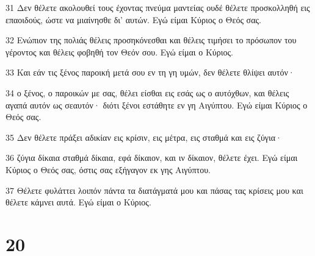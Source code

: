\par 31 Δεν θέλετε ακολουθεί τους έχοντας πνεύμα μαντείας ουδέ θέλετε προσκολληθή εις επαοιδούς, ώστε να μιαίνησθε δι' αυτών. Εγώ είμαι Κύριος ο Θεός σας.
\par 32 Ενώπιον της πολιάς θέλεις προσηκόνεσθαι και θέλεις τιμήσει το πρόσωπον του γέροντος και θέλεις φοβηθή τον Θεόν σου. Εγώ είμαι ο Κύριος.
\par 33 Και εάν τις ξένος παροική μετά σου εν τη γη υμών, δεν θέλετε θλίψει αυτόν·
\par 34 ο ξένος, ο παροικών με σας, θέλει είσθαι εις εσάς ως ο αυτόχθων, και θέλεις αγαπά αυτόν ως σεαυτόν· διότι ξένοι εστάθητε εν γη Αιγύπτου. Εγώ είμαι Κύριος ο Θεός σας.
\par 35 Δεν θέλετε πράξει αδικίαν εις κρίσιν, εις μέτρα, εις σταθμά και εις ζύγια·
\par 36 ζύγια δίκαια σταθμά δίκαια, εφά δίκαιον, και ιν δίκαιον, θέλετε έχει. Εγώ είμαι Κύριος ο Θεός σας, όστις σας εξήγαγον εκ γης Αιγύπτου.
\par 37 Θέλετε φυλάττει λοιπόν πάντα τα διατάγματά μου και πάσας τας κρίσεις μου και θέλετε κάμνει αυτά. Εγώ είμαι ο Κύριος.

\chapter{20}

